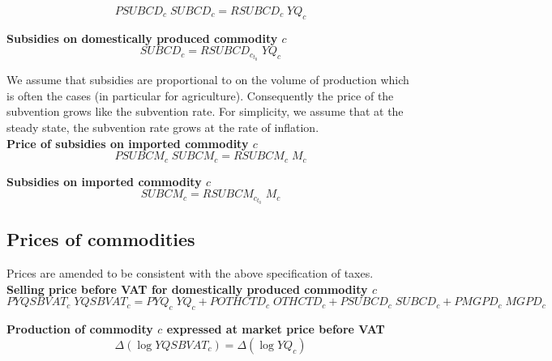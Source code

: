 \documentclass[12pt]{article}
\numberwithin{equation}{section}
\begin{document}
\begin{dmath}
PSUBCD_{c} \; SUBCD_{c} = RSUBCD_{c} \; YQ_{c}
\label{Exception_taxes_prices.mdlPSUBCD[c]}
\end{dmath}

\noindent \textbf{Subsidies on domestically produced commodity $c$} 
\begin{dmath}
SUBCD_{c} = RSUBCD_{c}_{t_0} \; YQ_{c}
\label{Exception_taxes_prices.mdlSUBCD[c]}
\end{dmath}

We assume that subsidies are proportional to on the volume of production which is often the cases (in particular for agriculture). Consequently the price of the subvention grows like the subvention rate. For simplicity, we assume that at the steady state, the subvention rate grows at the rate of inflation. \\

\noindent \textbf{Price of subsidies on imported commodity $c$} 
\begin{dmath}
PSUBCM_{c} \; SUBCM_{c} = RSUBCM_{c} \; M_{c}
\label{Exception_taxes_prices.mdlPSUBCM[c]}
\end{dmath}

\noindent \textbf{Subsidies on imported commodity $c$} 
\begin{dmath}
SUBCM_{c} = RSUBCM_{c}_{t_0} \; M_{c}
\label{Exception_taxes_prices.mdlSUBCM[c]}
\end{dmath}





\subsection{Prices of commodities}


 Prices are amended to be consistent with the above specification of taxes. \\

\noindent \textbf{Selling price before VAT for domestically produced commodity $c$} 
\begin{dmath}
PYQSBVAT_{c} \; YQSBVAT_{c} = PYQ_{c} \; YQ_{c} + POTHCTD_{c} \; OTHCTD_{c} + PSUBCD_{c} \; SUBCD_{c} + PMGPD_{c} \; MGPD_{c}
\label{Exception_taxes_prices.mdlPYQSBVAT[c]}
\end{dmath}

\noindent \textbf{Production of commodity $c$ expressed at market price before VAT} 
\begin{dmath}
\varDelta \left(\operatorname{log} YQSBVAT_{c}\right) = \varDelta \left(\operatorname{log} YQ_{c}\right)
\label{Exception_taxes_prices.mdlYQSBVAT[c]}
\end{dmath}
\end{document}
